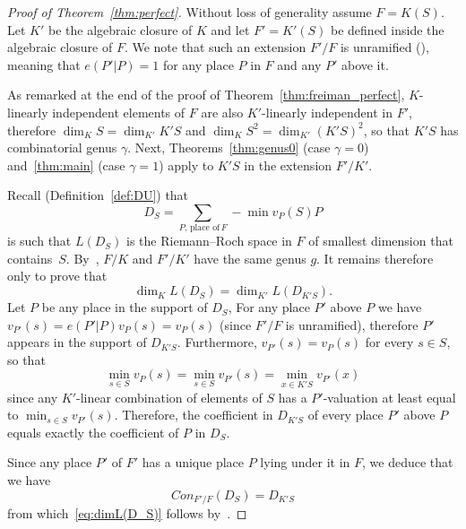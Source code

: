 \documentclass[10pt]{amsart}
\theoremstyle{definition}
\theoremstyle{remark}
\newcommand*{\MK}{\mkern 2mu}
\begin{document}
\begin{proof}[Proof of Theorem~\ref{thm:perfect}]
Without loss of generality assume $F=K(S)$. Let $K'$ be the algebraic closure of $K$ and let $F'=K'(S)$ be defined inside the algebraic closure of $F$. We note that such an extension $F'/F$ is unramified (\cite[Theorem~III.6.3$\MK$(a)]{Stichtenoth}), meaning that $e(P'|P)=1$ for any place $P$ in $F$ and any $P'$ above it.

As remarked at the end of the proof of Theorem~\ref{thm:freiman_perfect}, $K$-linearly independent elements of $F$ are also $K'$-linearly independent in $F'$, therefore $\dim_KS=\dim_{K'}K'S$ and $\dim_KS^2=\dim_{K'}(K'S)^2$, so that $K'S$ has combinatorial genus $\gamma$. Next, Theorems~\ref{thm:genus0} (case $\gamma=0$) and~\ref{thm:main} (case $\gamma=1$) apply to $K'S$ in the extension $F'/K'$.

Recall (Definition~\ref{def:DU}) that
\[
D_S=\sum_{P,\, \text{place of}\, F}-\min v_P(S)P
\]
is such that $L(D_S)$ is the Riemann--Roch space in $F$ of smallest dimension that contains~$S$. By~\cite[Theorem~III.6.3$\MK$(b)]{Stichtenoth}, $F/K$ and $F'/K'$ have the same genus $g$. It remains therefore only to prove that
\begin{equation}\label{eq:dimL(D_S)}
\dim_KL(D_S)=\dim_{K'}L(D_{K'S}).
\end{equation}
Let $P$ be any place in the support of $D_S$, For any place $P'$ above $P$ we have $v_{P'}(s)= e(P'|P)v_P(s)=v_P(s)$ (since $F'/F$ is unramified), therefore $P'$ appears in the support of $D_{K'S}$. Furthermore, $v_{P'}(s)=v_P(s)$ for every $s\in S$, so that
\[
\min_{s\in S}v_P(s)=\min_{s\in S}v_{P'}(s)=\min_{x\in
K'S}v_{P'}(x)
\]
since any $K'$-linear combination of elements of $S$ has a $P'$-valuation at least equal to $\min_{s\in S}v_{P'}(s)$. Therefore, the coefficient in $D_{K'S}$ of every place $P'$ above $P$ equals exactly the coefficient of $P$ in $D_S$.

Since any place $P'$ of $F'$ has a unique place $P$ lying under it in $F$, we deduce that we have
\[
Con_{F'/F}(D_S)= D_{K'S}
\]
from which~\eqref{eq:dimL(D_S)} follows by~\cite[Theorem~III.6.3$\MK$(d)]{Stichtenoth}.
\end{proof}
\end{document}
